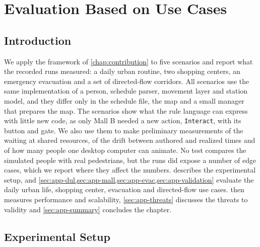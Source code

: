 \chapter{Evaluation Based on Use Cases}\label{chap:applications}

\section{Introduction}
\label{sec:app-intro}

We apply the framework of \cref{chap:contribution} to five scenarios and report what the recorded runs measured: a daily urban routine, two shopping centers, an emergency evacuation and a set of directed-flow corridors. All scenarios use the same implementation of a person, schedule parser, movement layer and station model, and they differ only in the schedule file, the map and a small manager that prepares the map. The scenarios show what the rule language can express with little new code, as only Mall B needed a new action, \texttt{Interact}, with its button and gate. We also use them to make preliminary measurements of the waiting at shared resources, of the drift between authored and realized times and of how many people one desktop computer can animate. No test compares the simulated people with real pedestrians, but the runs did expose a number of edge cases, which we report where they affect the numbers.  describes the experimental setup, and \cref{sec:app-dul,sec:app-mall,sec:app-evac,sec:app-validation} evaluate the daily urban life, shopping center, evacuation and directed-flow use cases.  then measures performance and scalability, \cref{sec:app-threats} discusses the threats to validity and \cref{sec:app-summary} concludes the chapter.

\section{Experimental Setup}
\label{sec:app-setup}

\begin{center}
\end{center}

